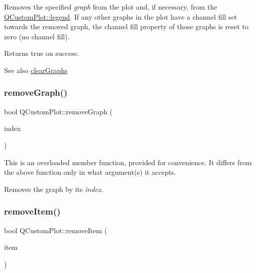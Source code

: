 Removes the specified {\itshape graph} from the plot and, if necessary, from the \hyperlink{class_q_custom_plot_a4eadcd237dc6a09938b68b16877fa6af}{Q\+Custom\+Plot\+::legend}. If any other graphs in the plot have a channel fill set towards the removed graph, the channel fill property of those graphs is reset to zero (no channel fill).

Returns true on success.

\begin{DoxySeeAlso}{See also}
\hyperlink{class_q_custom_plot_ab0f3abff2d2f7df3668b5836f39207fa}{clear\+Graphs} 
\end{DoxySeeAlso}
\hypertarget{class_q_custom_plot_a9554b3d2d5b10c0f884bd4010b6c192c}{}\label{class_q_custom_plot_a9554b3d2d5b10c0f884bd4010b6c192c} 
\subsubsection{\texorpdfstring{remove\+Graph()}{removeGraph()}\hspace{0.1cm}{\footnotesize\ttfamily [2/2]}}
{\footnotesize\ttfamily bool Q\+Custom\+Plot\+::remove\+Graph (\begin{DoxyParamCaption}\item[{int}]{index }\end{DoxyParamCaption})}

This is an overloaded member function, provided for convenience. It differs from the above function only in what argument(s) it accepts.

Removes the graph by its {\itshape index}. \hypertarget{class_q_custom_plot_ae04446557292551e8fb6e2c106e1848d}{}\label{class_q_custom_plot_ae04446557292551e8fb6e2c106e1848d} 
\subsubsection{\texorpdfstring{remove\+Item()}{removeItem()}\hspace{0.1cm}{\footnotesize\ttfamily [1/2]}}
{\footnotesize\ttfamily bool Q\+Custom\+Plot\+::remove\+Item (\begin{DoxyParamCaption}\item[{\hyperlink{class_q_c_p_abstract_item}{Q\+C\+P\+Abstract\+Item} $\ast$}]{item }\end{DoxyParamCaption})}

